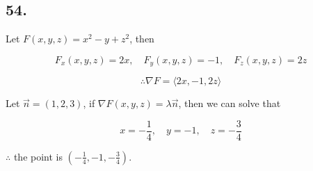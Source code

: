 \documentclass{article}
\begin{document}
  \subsection*{54. }

  Let $F(x, y, z) = x^2 - y + z^2$, then

  $$F_x(x, y, z) = 2x, \quad F_y(x, y, z) = -1, \quad F_z(x, y, z) = 2z$$

  $$\therefore \nabla F = \langle 2x, -1, 2z \rangle$$

  Let $\overrightarrow n = (1, 2, 3)$, if $\nabla F(x, y, z) = \lambda \overrightarrow n$, then we can solve that

  $$x=-\frac 1 4, \quad y = -1, \quad z=-\frac 3 4$$

  $\therefore$ the point is $(-\frac 1 4, -1, -\frac 3 4)$.
\end{document}
